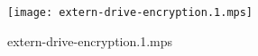 \documentclass[letterpaper,10pt]{article}
\begin{document}
\begin{figure}
    \centering
    \texttt{[image: extern-drive-encryption.1.mps]}
    \caption{extern-drive-encryption.1.mps}
\end{figure}
\end{document}
